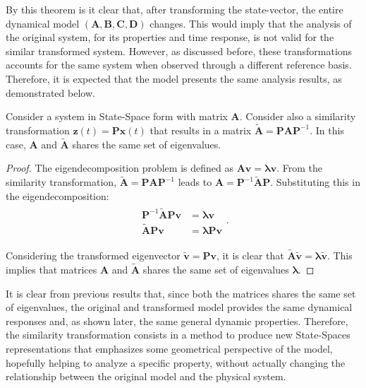 \documentclass[a4paper,11pt]{book}
\numberwithin{figure}{chapter}
\numberwithin{equation}{chapter}
\numberwithin{table}{chapter}
\newtheorem{theorem}{Theorem}[chapter]
\theoremstyle{definition}
\newcounter{boxed-theorem}
\newenvironment{boxed-theorem}[1]
{\colorlet{shadecolor}{pastelBlue2!10} \begin{shaded} \begin{theorem}{#1}}
{\end{theorem} \end{shaded}}
\newcounter{boxed-definition}
\newcounter{boxed-example}
\begin{document}
By this theorem is it clear that, after transforming the state-vector, the entire dynamical model $(\bm{A}, \bm{B}, \bm{C}, \bm{D})$ changes. This would imply that the analysis of the original system, for its properties and time response, is not valid for the similar transformed system. However, as discussed before, these transformations accounts for the same system when observed through a different reference basis. Therefore, it is expected that the model presents the same analysis results, as demonstrated below.

\begin{boxed-theorem}{} \label{th:simTrans01}
    Consider a system in State-Space form with matrix $\bm{A}$. Consider also a similarity transformation $\bm{z}(t) = \bm{P} \bm{x}(t)$ that results in a matrix $\tilde{\bm{A}} = \bm{P} \bm{A} \bm{P}^{-1}$. In this case, $\bm{A}$ and $\tilde{\bm{A}}$ shares the same set of eigenvalues.
\end{boxed-theorem}

\begin{proof}
    The eigendecomposition problem is defined as $\bm{A} \bm{v} = \bm{\lambda} \bm{v}$. From the similarity transformation, $\tilde{\bm{A}} = \bm{P} \bm{A} \bm{P}^{-1}$ leads to $\bm{A} = \bm{P}^{-1} \tilde{\bm{A}} \bm{P}$. Substituting this in the eigendecomposition:
    \begin{align}
    \begin{split}
        \bm{P}^{-1} \tilde{\bm{A}} \bm{P} \bm{v} & = \bm{\lambda} \bm{v} \\
        \tilde{\bm{A}} \bm{P} \bm{v} & =  \bm{\lambda} \bm{P} \bm{v}
    \end{split}
    .\end{align}
   
    Considering the transformed eigenvector $\tilde{\bm{v}} = \bm{P} \bm{v}$, it is clear that $\tilde{\bm{A}} \tilde{\bm{v}} = \bm{\lambda} \tilde{\bm{v}}$. This implies that matrices $\bm{A}$ and $\tilde{\bm{A}}$ shares the same set of eigenvalues $\bm{\lambda}$.
\end{proof}

It is clear from previous results that, since both the matrices shares the same set of eigenvalues, the original and transformed model provides the same dynamical responses and, as shown later, the same general dynamic properties. Therefore, the similarity transformation consists in a method to produce new State-Spaces representations that emphasizes some geometrical perspective of the model, hopefully helping to analyze a specific property, without actually changing the relationship between the original model and the physical system.
\end{document}
